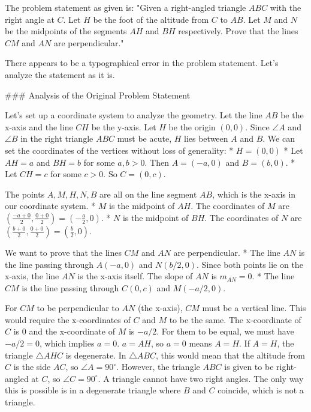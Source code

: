 The problem statement as given is:
"Given a right-angled triangle $ABC$ with the right angle at $C$. Let $H$ be the foot of the altitude from $C$ to $A B$. Let $M$ and $N$ be the midpoints of the segments $AH$ and $BH$ respectively. Prove that the lines $CM$ and $AN$ are perpendicular."

There appears to be a typographical error in the problem statement. Let's analyze the statement as it is.

### Analysis of the Original Problem Statement

Let's set up a coordinate system to analyze the geometry. Let the line $AB$ be the x-axis and the line $CH$ be the y-axis. Let $H$ be the origin $(0,0)$.
Since $\angle A$ and $\angle B$ in the right triangle $ABC$ must be acute, $H$ lies between $A$ and $B$. We can set the coordinates of the vertices without loss of generality:
* $H = (0,0)$
* Let $AH = a$ and $BH = b$ for some $a,b > 0$. Then $A = (-a, 0)$ and $B = (b, 0)$.
* Let $CH=c$ for some $c > 0$. So $C = (0, c)$.

The points $A, M, H, N, B$ are all on the line segment $AB$, which is the x-axis in our coordinate system.
* $M$ is the midpoint of $AH$. The coordinates of $M$ are $\left(\frac{-a+0}{2}, \frac{0+0}{2}\right) = \left(-\frac{a}{2}, 0\right)$.
* $N$ is the midpoint of $BH$. The coordinates of $N$ are $\left(\frac{b+0}{2}, \frac{0+0}{2}\right) = \left(\frac{b}{2}, 0\right)$.

We want to prove that the lines $CM$ and $AN$ are perpendicular.
* The line $AN$ is the line passing through $A(-a, 0)$ and $N(b/2, 0)$. Since both points lie on the x-axis, the line $AN$ is the x-axis itself. The slope of $AN$ is $m_{AN}=0$.
* The line $CM$ is the line passing through $C(0, c)$ and $M(-a/2, 0)$.

For $CM$ to be perpendicular to $AN$ (the x-axis), $CM$ must be a vertical line. This would require the x-coordinates of $C$ and $M$ to be the same. The x-coordinate of $C$ is $0$ and the x-coordinate of $M$ is $-a/2$.
For them to be equal, we must have $-a/2 = 0$, which implies $a=0$.
$a=AH$, so $a=0$ means $A=H$. If $A=H$, the triangle $\triangle AHC$ is degenerate. In $\triangle ABC$, this would mean that the altitude from $C$ is the side $AC$, so $\angle A = 90^\circ$.
However, the triangle $ABC$ is given to be right-angled at $C$, so $\angle C = 90^\circ$. A triangle cannot have two right angles. The only way this is possible is in a degenerate triangle where $B$ and $C$ coincide, which is not a triangle.

